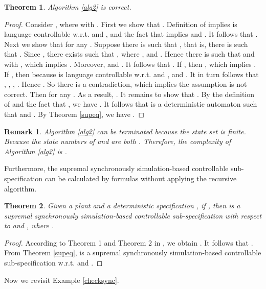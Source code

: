 \documentclass[preprint,authoryear,12pt]{elsarticle}
\newtheorem{Theorem}{Theorem}
\newtheorem{Remark}{Remark}
\begin{document}
\begin{Theorem}\label{calz}
Algorithm \ref{alg2} is correct.
\end{Theorem}
\begin{proof}
Consider , where  with  . First we show that . Definition of
 implies  is language controllable w.r.t. 
and , and the fact that  implies
  and . It follows that
. Next we show that  for
any . Suppose there is  such that
, that is, there is 
such that . Since , there exists  such that
, where ,
 and .
Hence there is  such that  and  with
, which implies . Moreover,
 and . It follows that . If , then ,
which implies . If , then
 because  is
language controllable w.r.t.  and ,  and . It in
turn follows that ,
, , . Hence . So there is a
contradiction, which implies the assumption is not correct. Then
 for any . As a result,
. It remains to show that .
By the definition of  and the fact that , we have 
. It follows that  is
a deterministic automaton such that  and
 . By Theorem \ref{supeq}, we have .

\end{proof}



\begin{Remark}
Algorithm \ref{alg2} can be terminated because the state set 
is finite. Because the state numbers of  and 
are both . Therefore, the complexity of Algorithm
\ref{alg2} is .
\end{Remark}









Furthermore, the supremal synchronously simulation-based
controllable sub-specification can be calculated by formulas
without applying the recursive algorithm.


\begin{Theorem}\label{calsupsub}
Given a plant  and a deterministic specification , if
, then
 is a supremal synchronously simulation-based
controllable sub-specification with respect to  and
, where .
\end{Theorem}
\begin{proof}
According to Theorem 1 and Theorem 2 in
\citep{brandt1990formulas}, we obtain . It follows that
. From Theorem \ref{supeq},  is a supremal
synchronously simulation-based controllable sub-specification
w.r.t.  and .
\end{proof}



Now we revisit Example \ref{checksync}.
\end{document}
